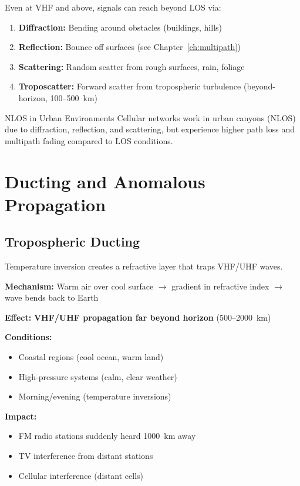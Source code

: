 Even at VHF and above, signals can reach beyond LOS via:

\begin{enumerate}
\item \textbf{Diffraction:} Bending around obstacles (buildings, hills)
\item \textbf{Reflection:} Bounce off surfaces (see Chapter~\ref{ch:multipath})
\item \textbf{Scattering:} Random scatter from rough surfaces, rain, foliage
\item \textbf{Troposcatter:} Forward scatter from tropospheric turbulence (beyond-horizon, 100--500~km)
\end{enumerate}

\begin{calloutbox}{NLOS in Urban Environments}
Cellular networks work in urban canyons (NLOS) due to diffraction, reflection, and scattering, but experience higher path loss and multipath fading compared to LOS conditions.
\end{calloutbox}

\section{Ducting and Anomalous Propagation}

\subsection{Tropospheric Ducting}

Temperature inversion creates a refractive layer that traps VHF/UHF waves.

\textbf{Mechanism:} Warm air over cool surface $\rightarrow$ gradient in refractive index $\rightarrow$ wave bends back to Earth

\textbf{Effect:} \textbf{VHF/UHF propagation far beyond horizon} (500--2000~km)

\textbf{Conditions:}
\begin{itemize}
\item Coastal regions (cool ocean, warm land)
\item High-pressure systems (calm, clear weather)
\item Morning/evening (temperature inversions)
\end{itemize}

\textbf{Impact:}
\begin{itemize}
\item FM radio stations suddenly heard 1000~km away
\item TV interference from distant stations
\item Cellular interference (distant cells)
\end{itemize}

